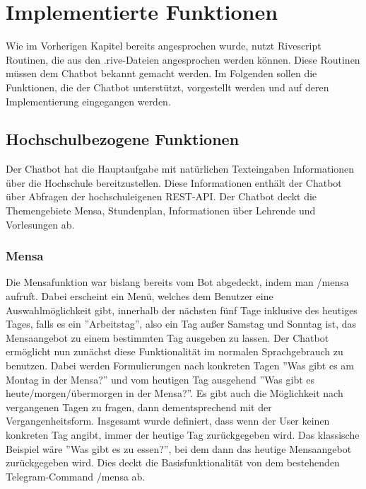 \chapter{Implementierte Funktionen}
Wie im Vorherigen Kapitel bereits angesprochen wurde, nutzt Rivescript Routinen, die aus den .rive-Dateien angesprochen werden können. Diese Routinen müssen dem Chatbot bekannt gemacht werden. Im Folgenden sollen die Funktionen, die der Chatbot unterstützt, vorgestellt werden und auf deren Implementierung eingegangen werden.

\section{Hochschulbezogene Funktionen}
Der Chatbot hat die Hauptaufgabe mit natürlichen Texteingaben Informationen über die Hochschule bereitzustellen. Diese Informationen enthält der Chatbot über Abfragen der hochschuleigenen REST-API. Der Chatbot deckt die Themengebiete Mensa, Stundenplan, Informationen über Lehrende und Vorlesungen ab.

\subsection{Mensa}
Die Mensafunktion war bislang bereits vom Bot abgedeckt, indem man /mensa aufruft. Dabei erscheint ein Menü, welches dem Benutzer eine Auswahlmöglichkeit gibt, innerhalb der nächsten fünf Tage inklusive des heutiges Tages, falls es ein ''Arbeitstag'', also ein Tag außer Samstag und Sonntag ist, das Mensaangebot zu einem bestimmten Tag ausgeben zu lassen.
Der Chatbot ermöglicht nun zunächst diese Funktionalität im normalen Sprachgebrauch zu benutzen. Dabei werden Formulierungen nach konkreten Tagen ''Was gibt es am Montag in der Mensa?'' und vom heutigen Tag ausgehend ''Was gibt es heute/morgen/übermorgen in der Mensa?''. Es gibt auch die Möglichkeit nach vergangenen Tagen zu fragen, dann dementsprechend mit der Vergangenheitsform. Insgesamt wurde definiert, dass wenn der User keinen konkreten Tag angibt, immer der heutige Tag zurückgegeben wird. Das klassische Beispiel wäre ''Was gibt es zu essen?'', bei dem dann das heutige Mensaangebot zurückgegeben wird.
Dies deckt die Basisfunktionalität von dem bestehenden Telegram-Command /mensa ab.

